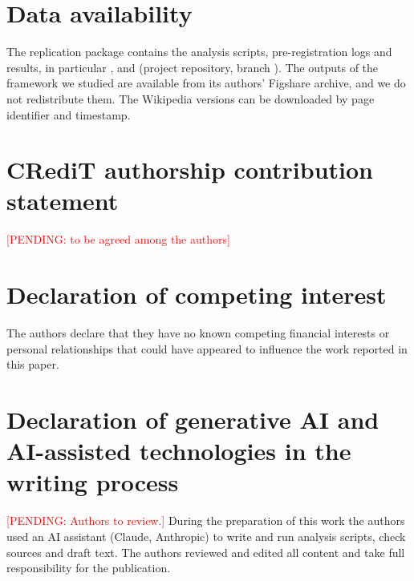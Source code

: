 \documentclass[preprint,12pt,authoryear]{elsarticle}
\newcommand{\pending}[1]{\textcolor{red}{[PENDING: #1]}}
\begin{document}
\section*{Data availability}
The replication package contains the analysis scripts, pre-registration logs and results, in
particular ,  and
 (project repository, branch
). The outputs of the framework we studied are available from its
authors' Figshare archive, and we do not redistribute them. The Wikipedia versions can be downloaded
by page identifier and timestamp.

\section*{CRediT authorship contribution statement}
\pending{to be agreed among the authors}

\section*{Declaration of competing interest}
The authors declare that they have no known competing financial interests or personal
relationships that could have appeared to influence the work reported in this paper.

\section*{Declaration of generative AI and AI-assisted technologies in the writing process}
\pending{Authors to review.} During the preparation of this work the authors used an AI assistant
(Claude, Anthropic) to write and run analysis scripts, check sources and draft text. The authors
reviewed and edited all content and take full responsibility for the publication.



\end{document}
